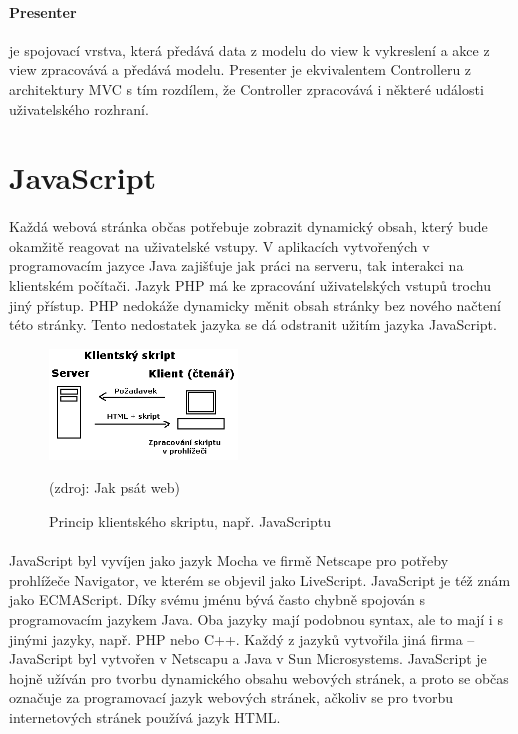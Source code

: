 \documentclass[11pt,a4paper,titlepage,oneside]{book}
\begin{document}
				\paragraph{Presenter} je spojovací vrstva, která předává data z modelu do view k vykreslení a akce z view zpracovává a předává modelu. Presenter je ekvivalentem Controlleru z architektury MVC s tím rozdílem, že Controller zpracovává i některé události uživatelského rozhraní.

	\section{JavaScript} %
		\paragraph{} Každá webová stránka občas potřebuje zobrazit dynamický obsah, který bude okamžitě reagovat na uživatelské vstupy. V aplikacích vytvořených v programovacím jazyce Java zajišťuje jak práci na serveru, tak interakci na klientském počítači. Jazyk \ac{PHP} má ke zpracování uživatelských vstupů trochu jiný přístup. \ac{PHP} nedokáže dynamicky měnit obsah stránky bez nového načtení této stránky. Tento nedostatek jazyka se dá odstranit užitím jazyka JavaScript.


		\begin{figure}[!h]
			\begin{center}
				\includegraphics[width=5cm]{obrazky/klient_skript.png}
				\caption{Princip klientského skriptu, např. JavaScriptu}
				\label{fig:client}
				(zdroj: Jak psát web\cite{jakPsatWeb})
			\end{center}
		\end{figure}	
		\paragraph{} JavaScript byl vyvíjen jako jazyk Mocha ve firmě Netscape pro potřeby prohlížeče Navigator\cite{crockford}, ve kterém se objevil jako LiveScript. JavaScript je též znám jako ECMAScript. Díky svému jménu bývá často chybně spojován s programovacím jazykem Java. Oba jazyky mají podobnou syntax, ale to mají i s jinými jazyky, např. PHP nebo C++. Každý z jazyků vytvořila jiná firma -- JavaScript byl vytvořen v Netscapu a Java v Sun Microsystems. JavaScript je hojně užíván pro tvorbu dynamického obsahu webových stránek, a proto se občas označuje za programovací jazyk webových stránek, ačkoliv se pro tvorbu internetových stránek používá jazyk \ac{HTML}.
\end{document}
